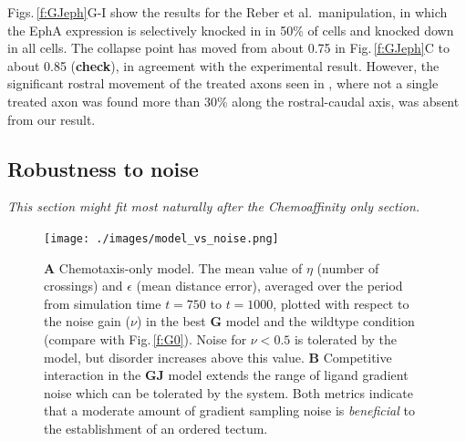 \documentclass[11pt, a4paper]{article}
\begin{document}
Figs.\,\ref{f:GJeph}G-I show the results for the Reber et al.~manipulation, in
which the EphA expression is selectively knocked in in 50\% of cells and
knocked down in all cells. The collapse point has moved from about 0.75 in
Fig.\,\ref{f:GJeph}C to about 0.85 (\textbf{check}), in agreement with the
experimental result. However, the significant rostral movement of the treated
axons seen in \citet{reber_relative_2004}, where not a single treated axon was
found more than 30\% along the rostral-caudal axis, was absent from our result.




\subsection*{Robustness to noise}

\emph{This section might fit most naturally after the Chemoaffinity only section.}

\begin{figure}
\centering
\texttt{[image: ./images/model\_vs\_noise.png]}
\caption{ \textbf{A} Chemotaxis-only model. The mean value of $\eta$ (number of crossings) and $\epsilon$
(mean distance error), averaged over the period from simulation time $t=750$
to $t=1000$, plotted with respect to the noise gain ($\nu$) in the best
$\mathbf{G}$ model and the wildtype condition (compare with
Fig.\,\ref{f:G0}). Noise for $\nu < 0.5$ is tolerated by the model, but
disorder increases above this value.
\textbf{B} Competitive interaction in the $\mathbf{GJ}$ model extends the
range of ligand gradient noise which can be tolerated by the system.
Both metrics indicate that a moderate
amount of gradient sampling noise is \emph{beneficial} to the establishment of
an ordered tectum.}
\label{f:noise}
\end{figure}
\end{document}

